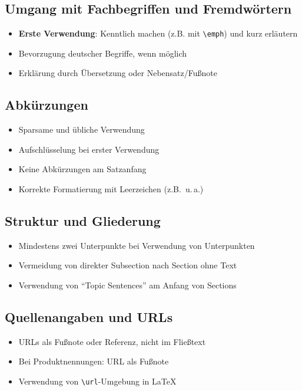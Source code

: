 \documentclass[a4paper,12pt]{article}
\begin{document}
\subsection{Umgang mit Fachbegriffen und Fremdwörtern}
\begin{itemize}
    \item \textbf{Erste Verwendung}: Kenntlich machen (z.B. mit \verb|\emph|) und kurz erläutern
    \item Bevorzugung deutscher Begriffe, wenn möglich
    \item Erklärung durch Übersetzung oder Nebensatz/Fußnote
\end{itemize}

\subsection{Abkürzungen}
\begin{itemize}
    \item Sparsame und übliche Verwendung
    \item Aufschlüsselung bei erster Verwendung
    \item Keine Abkürzungen am Satzanfang
    \item Korrekte Formatierung mit Leerzeichen (z.B.~u.\,a.)
\end{itemize}

\subsection{Struktur und Gliederung}
\begin{itemize}
    \item Mindestens zwei Unterpunkte bei Verwendung von Unterpunkten
    \item Vermeidung von direkter Subsection nach Section ohne Text
    \item Verwendung von ``Topic Sentences'' am Anfang von Sections
\end{itemize}

\subsection{Quellenangaben und URLs}
\begin{itemize}
    \item URLs als Fußnote oder Referenz, nicht im Fließtext
    \item Bei Produktnennungen: URL als Fußnote
    \item Verwendung von \verb|\url|-Umgebung in LaTeX
\end{itemize}
\end{document}
